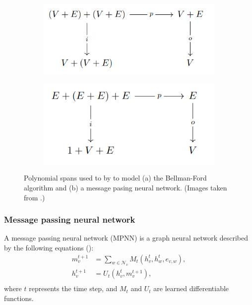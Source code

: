 \documentclass[11pt,a4paper,openright,twoside]{report}
\theoremstyle{plain}
\theoremstyle{definition}
\begin{document}
\begin{figure}[h]
  \begin{center}
    \begin{subfigure}{0.45\textwidth}
      \includegraphics[width=\textwidth]{figures/poly_span_bellman_ford.png}
      \caption{}
    \end{subfigure}
    \begin{subfigure}{0.4\textwidth}
      \includegraphics[width=\textwidth]{figures/poly_span_message_passing.png}
      \caption{}
    \end{subfigure}            
    \caption[Bellman-Ford algorithm and message passing networks]{Polynomial spans used to by \cite{dudzik2022graph} to model (a) the Bellman-Ford algorithm and (b) a message pasing neural network. (Images taken from \cite{dudzik2022graph}.)}
    \label{fig: polyspans}
  \end{center}
\end{figure}

\subsubsection{Message passing neural network}

A message passing neural network (MPNN) is a graph neural network described by the following equations (\cite{pmlr-v70-gilmer17a}):
\begin{align*}
  m_v^{t+1} &= \sum_{w \in \mathcal{N}_v}M_t(h_v^t,h_w^t,e_{v,w}),\\
  h_v^{t+1} &= U_t(h_v^t,m_v^{t+1}),\\
\end{align*}
where $t$ represents the time step, and $M_t$ and $U_t$ are learned differentiable functions.
\end{document}
